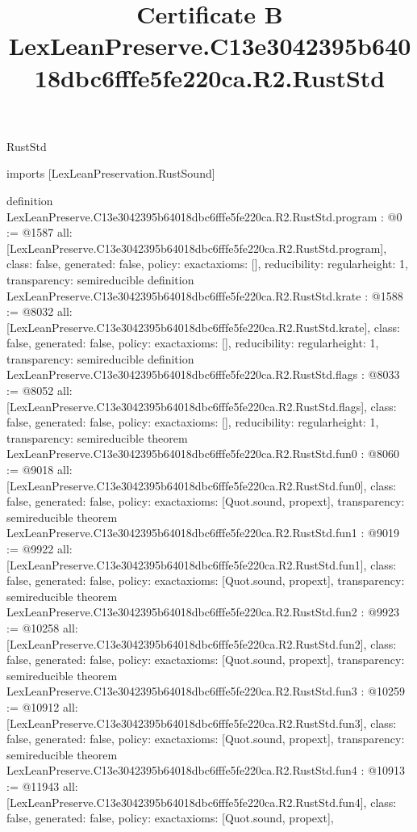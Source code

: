 \begin{lexlean}{RustStd}
\title{Certificate B LexLeanPreserve.C13e3042395b64018dbc6fffe5fe220ca.R2.RustStd}
\begin{coremodule}
imports [LexLeanPreservation.RustSound]

definition LexLeanPreserve.C13e3042395b64018dbc6fffe5fe220ca.R2.RustStd.program : @0 := @1587 {
  all: [LexLeanPreserve.C13e3042395b64018dbc6fffe5fe220ca.R2.RustStd.program],
  class: false,
  generated: false,
  policy: exact{axioms: []},
  reducibility: regular{height: 1},
  transparency: semireducible
}
definition LexLeanPreserve.C13e3042395b64018dbc6fffe5fe220ca.R2.RustStd.krate : @1588 := @8032 {
  all: [LexLeanPreserve.C13e3042395b64018dbc6fffe5fe220ca.R2.RustStd.krate],
  class: false,
  generated: false,
  policy: exact{axioms: []},
  reducibility: regular{height: 1},
  transparency: semireducible
}
definition LexLeanPreserve.C13e3042395b64018dbc6fffe5fe220ca.R2.RustStd.flags : @8033 := @8052 {
  all: [LexLeanPreserve.C13e3042395b64018dbc6fffe5fe220ca.R2.RustStd.flags],
  class: false,
  generated: false,
  policy: exact{axioms: []},
  reducibility: regular{height: 1},
  transparency: semireducible
}
theorem LexLeanPreserve.C13e3042395b64018dbc6fffe5fe220ca.R2.RustStd.fun0 : @8060 := @9018 {
  all: [LexLeanPreserve.C13e3042395b64018dbc6fffe5fe220ca.R2.RustStd.fun0],
  class: false,
  generated: false,
  policy: exact{axioms: [Quot.sound, propext]},
  transparency: semireducible
}
theorem LexLeanPreserve.C13e3042395b64018dbc6fffe5fe220ca.R2.RustStd.fun1 : @9019 := @9922 {
  all: [LexLeanPreserve.C13e3042395b64018dbc6fffe5fe220ca.R2.RustStd.fun1],
  class: false,
  generated: false,
  policy: exact{axioms: [Quot.sound, propext]},
  transparency: semireducible
}
theorem LexLeanPreserve.C13e3042395b64018dbc6fffe5fe220ca.R2.RustStd.fun2 : @9923 := @10258 {
  all: [LexLeanPreserve.C13e3042395b64018dbc6fffe5fe220ca.R2.RustStd.fun2],
  class: false,
  generated: false,
  policy: exact{axioms: [Quot.sound, propext]},
  transparency: semireducible
}
theorem LexLeanPreserve.C13e3042395b64018dbc6fffe5fe220ca.R2.RustStd.fun3 : @10259 := @10912 {
  all: [LexLeanPreserve.C13e3042395b64018dbc6fffe5fe220ca.R2.RustStd.fun3],
  class: false,
  generated: false,
  policy: exact{axioms: [Quot.sound, propext]},
  transparency: semireducible
}
theorem LexLeanPreserve.C13e3042395b64018dbc6fffe5fe220ca.R2.RustStd.fun4 : @10913 := @11943 {
  all: [LexLeanPreserve.C13e3042395b64018dbc6fffe5fe220ca.R2.RustStd.fun4],
  class: false,
  generated: false,
  policy: exact{axioms: [Quot.sound, propext]},
}
\end{coremodule}
\end{lexlean}
